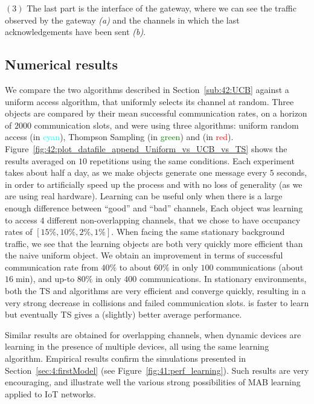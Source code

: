 $(3)$ The last part is the interface of the gateway, where we can see the traffic observed by the gateway \emph{(a)} and the channels in which the last acknowledgements have been sent \emph{(b)}.


\subsection{Numerical results}
\label{sec:42:results}

We compare the two algorithms described in Section~\ref{sub:42:UCB} against a uniform access algorithm, that uniformly selects its channel at random.
Three objects are compared by their mean successful communication rates, on a horizon of $2000$ communication slots, and were using three algorithms: uniform random access (in \textcolor{cyan}{cyan}), Thompson Sampling (in \textcolor{green}{green}) and \UCB{} (in \textcolor{red}{red}).
Figure~\ref{fig:42:plot_datafile_append_Uniform_vs_UCB_vs_TS} shows the results averaged on $10$ repetitions using the same conditions.
%
Each experiment takes about half a day,
as we make objects generate one message every $5$ seconds, in order to artificially speed up the process and with no loss of generality (as we are using real hardware).
Learning can be useful only when there is a large enough difference between ``good'' and ``bad'' channels,
Each object was learning to access $4$ different non-overlapping channels, that we chose to have occupancy rates of $[15\%, 10\%, 2\%, 1\%]$.
When facing the same stationary background traffic, we see that the learning objects are both very quickly more efficient than the naive uniform object.
We obtain an improvement in terms of successful communication rate from $40\%$ to about $60\%$ in only $100$ communications (about $16\;\mathrm{min}$), and up-to $80\%$ in only $400$ communications.
%
In stationary environments, both the TS and \UCB{} algorithms are very efficient and converge quickly, resulting in a very strong decrease in collisions and failed communication slots. \UCB{} is faster to learn but eventually TS gives a (slightly) better average performance.

Similar results are obtained for overlapping channels, when dynamic devices are learning in the presence of multiple devices, all using the same learning algorithm.
Empirical results confirm the simulations presented in Section~\ref{sec:4:firstModel} (see Figure~\ref{fig:41:perf_learning}).
Such results are very encouraging, and illustrate well the various strong possibilities of MAB learning applied to IoT networks.


